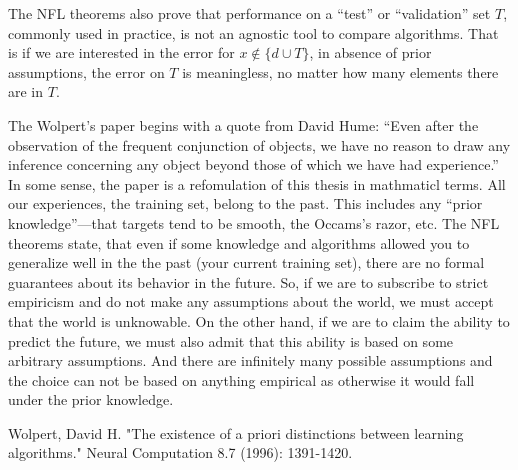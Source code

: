 \documentclass[a4paper]{article}
\begin{document}
The NFL theorems also prove that performance on a ``test'' or
``validation'' set $T$, commonly used in practice, is not an agnostic
tool to compare algorithms. That is if we are interested in the error
for $x\notin \{d \cup T\}$, in absence of prior assumptions, the error
on $T$ is meaningless, no matter how many elements there are in $T$.

The Wolpert's paper begins with a quote from David Hume: ``Even after
the observation of the frequent conjunction of objects, we have no
reason to draw any inference concerning any object beyond those of
which we have had experience.'' In some sense, the paper is a
refomulation of this thesis in mathmaticl terms. All our experiences,
the training set, belong to the past. This includes any ``prior
knowledge''---that targets tend to be smooth, the Occams's razor,
etc. The NFL theorems state, that even if some knowledge and
algorithms allowed you to generalize well in the the past (your
current training set), there are no formal guarantees about its
behavior in the future. So, if we are to subscribe to strict
empiricism and do not make any assumptions about the world, we must
accept that the world is unknowable. On the other hand, if we are to
claim the ability to predict the future, we must also admit that this
ability is based on some arbitrary assumptions. And there are
infinitely many possible assumptions and the choice can not be based
on anything empirical as otherwise it would fall under the prior
knowledge.


\begin{thebibliography}{99}
 Wolpert, David H. "The existence of a
  priori distinctions between learning algorithms." Neural Computation
  8.7 (1996): 1391-1420.
\end{thebibliography}
\end{document}
